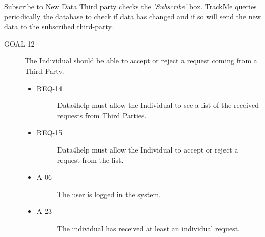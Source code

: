 \documentclass[a4paper]{article}
\newcommand{\requirement}{\ding{229}}%
\begin{document}
        \begin{usecase}{Subscribe to New Data}
            {Third party checks the \textit{'Subscribe'} box.}
            {TrackMe queries periodically the database to check if data has changed and if so will send the new data to the subscribed third-party.}
        \end{usecase}
        
        \begin{description}
        	\item[GOAL-12] The Individual should be able to accept or reject a request coming from a Third-Party. 
            	\begin{itemize}
            	    \item[\requirement]
                	\begin{description}
                	\item[REQ-14] Data4help must allow the Individual to see a list of the received requests from Third Parties. 
                	\end{description}
                	\item[\requirement]
                	\begin{description}
                	\item[REQ-15] Data4help must allow the Individual to accept or reject a request from the list. 
                	\end{description}
                	\item
                	\begin{description}
                	\item[A-06] The user is logged in the system.
                	\end{description}
                	\item
                	\begin{description}
                	\item[A-23] The individual has received at least an individual request.
                	\end{description}
                	\end{itemize}
        \end{description}
        
\end{document}
